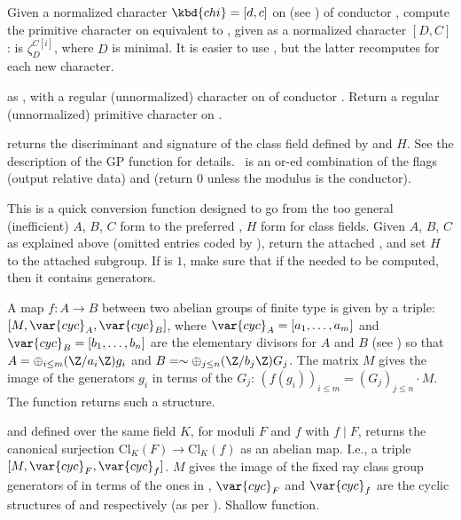 Given a normalized character $\kbd{chi} = [d,c]$ on  (see
) of conductor ,  compute the primitive
character  on  equivalent to , given as a
normalized character $[D,C]$ :  is $\zeta_D^{C[i]}$,
where $D$ is minimal. It is easier to use ,
but the latter recomputes  for each new character.

 as
, with  a regular (unnormalized) character
on  of conductor . Return a regular
(unnormalized) primitive character on .

 returns the discriminant and
signature of the class field defined by  and $H$. See the description
of the GP function for details. \fl\ is an or-ed combination of the flags
 (output relative data) and  (return 0 unless the
modulus is the conductor).

 This is a
quick conversion function designed to go from the too general (inefficient)
$A$, $B$, $C$ form to the preferred , $H$ form for class fields.
Given $A$, $B$, $C$ as explained above (omitted entries coded by ),
return the attached , and set $H$ to the attached subgroup. If
 is $1$, make sure that if the  needed to be computed,
then it contains generators.

A map $f:A\to B$ between two abelian groups of finite type is given by a
triple: $[M, \var{cyc}_A, \var{cyc}_B]$, where $\var{cyc}_A = [a_1,\dots, a_m]$
and $\var{cyc}_B = [b_1,\dots, b_n]$ are the elementary divisors for $A$ and
$B$ (see ) so that $A = \oplus_{i\leq m} (\Z/a_i\Z) g_i$
and $B = \sim \oplus_{j\leq n} (\Z/b_j\Z) G_j $. The matrix $M$ gives the image
of the generators $g_i$ in terms of the $G_j$: $(f(g_i))_{i\leq m} =
(G_j)_{j\leq n} \cdot M$. The function  returns such a structure.

  and 
defined over the same field $K$, for moduli $F$ and $f$ with
$f\mid F$, returns the canonical surjection
$\text{Cl}_K(F)\to \text{Cl}_K(f)$ as an abelian map. I.e., a triple
$[M,\var{cyc}_F,\var{cyc}_f]$. $M$ gives the image of the fixed ray class
group generators of  in terms of the ones in ,
$\var{cyc}_F$ and $\var{cyc}_f$ are the cyclic structures of  and
 respectively (as per ). Shallow function.

